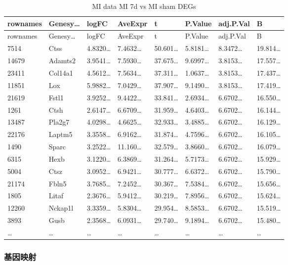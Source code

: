 \documentclass[
]{article}
\begin{document}
\begin{longtable}[]{@{}llllllll@{}}
\caption{\label{tab:MI-data-MI-7d-vs-MI-sham-DEGs}MI data MI 7d vs MI sham DEGs}\tabularnewline
\toprule
rownames & Genesy\ldots{} & logFC & AveExpr & t & P.Value & adj.P.Val & B\tabularnewline
\midrule
\endfirsthead
\toprule
rownames & Genesy\ldots{} & logFC & AveExpr & t & P.Value & adj.P.Val & B\tabularnewline
\midrule
\endhead
7514 & Ctss & 4.8320\ldots{} & 7.4632\ldots{} & 50.601\ldots{} & 5.8181\ldots{} & 8.3472\ldots{} & 19.814\ldots{}\tabularnewline
14679 & Adamts2 & 3.9541\ldots{} & 7.5930\ldots{} & 37.675\ldots{} & 9.6997\ldots{} & 3.8153\ldots{} & 17.557\ldots{}\tabularnewline
23411 & Col14a1 & 4.5612\ldots{} & 7.5634\ldots{} & 37.311\ldots{} & 1.0637\ldots{} & 3.8153\ldots{} & 17.437\ldots{}\tabularnewline
11851 & Lox & 5.9882\ldots{} & 7.0429\ldots{} & 37.907\ldots{} & 9.1490\ldots{} & 3.8153\ldots{} & 17.419\ldots{}\tabularnewline
21619 & Fstl1 & 3.9252\ldots{} & 9.4422\ldots{} & 33.841\ldots{} & 2.6934\ldots{} & 6.6702\ldots{} & 16.550\ldots{}\tabularnewline
1261 & Ctsh & 2.6147\ldots{} & 6.6709\ldots{} & 31.959\ldots{} & 4.6403\ldots{} & 6.6702\ldots{} & 16.144\ldots{}\tabularnewline
13487 & Pla2g7 & 4.0298\ldots{} & 4.6625\ldots{} & 32.933\ldots{} & 3.4885\ldots{} & 6.6702\ldots{} & 16.129\ldots{}\tabularnewline
22176 & Laptm5 & 3.3558\ldots{} & 6.9162\ldots{} & 31.874\ldots{} & 4.7596\ldots{} & 6.6702\ldots{} & 16.105\ldots{}\tabularnewline
1490 & Sparc & 3.2522\ldots{} & 11.160\ldots{} & 32.579\ldots{} & 3.8660\ldots{} & 6.6702\ldots{} & 16.079\ldots{}\tabularnewline
6315 & Hexb & 3.1220\ldots{} & 6.3869\ldots{} & 31.264\ldots{} & 5.7173\ldots{} & 6.6702\ldots{} & 15.929\ldots{}\tabularnewline
5004 & Ctsz & 3.0952\ldots{} & 6.9421\ldots{} & 30.777\ldots{} & 6.6372\ldots{} & 6.6702\ldots{} & 15.790\ldots{}\tabularnewline
21174 & Fbln5 & 3.7685\ldots{} & 7.2452\ldots{} & 30.367\ldots{} & 7.5384\ldots{} & 6.6702\ldots{} & 15.656\ldots{}\tabularnewline
1805 & Litaf & 2.3676\ldots{} & 5.9412\ldots{} & 30.219\ldots{} & 7.8956\ldots{} & 6.6702\ldots{} & 15.624\ldots{}\tabularnewline
12260 & Nckap1l & 3.3359\ldots{} & 5.8304\ldots{} & 29.954\ldots{} & 8.5853\ldots{} & 6.6702\ldots{} & 15.519\ldots{}\tabularnewline
3893 & Gusb & 2.3568\ldots{} & 6.0931\ldots{} & 29.740\ldots{} & 9.1894\ldots{} & 6.6702\ldots{} & 15.480\ldots{}\tabularnewline
\ldots{} & \ldots{} & \ldots{} & \ldots{} & \ldots{} & \ldots{} & \ldots{} & \ldots{}\tabularnewline
\bottomrule
\end{longtable}

\hypertarget{ux57faux56e0ux6620ux5c04}{%
\subsubsection{基因映射}\label{ux57faux56e0ux6620ux5c04}}
\end{document}
